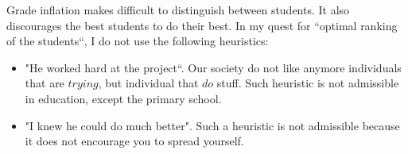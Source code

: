 Grade inflation makes difficult to distinguish between students.
It also discourages the best students to do their best.
In my quest for ``optimal ranking of the students``, I do not use the following heuristics:

\begin{itemize}
 \item "He worked hard at the project``. 
Our society do not like anymore individuals that are $trying$, but individual that $do$ stuff.
Such heuristic is not admissible in education, except the primary school.

\item "I knew he could do much better". 
Such a heuristic is not admissible because it does not encourage you to spread yourself.
\end{itemize}

